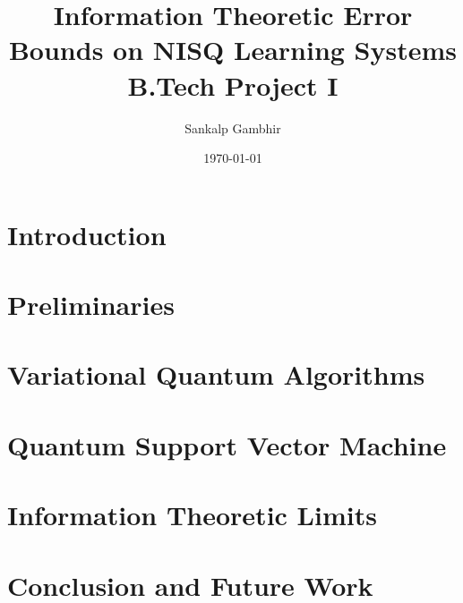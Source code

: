 \documentclass[
    paper=a4, 
    lang=en, 
    font=kpfonts, 
    hanging-titles=true,
    final
]
{skrapport}
\title{
    {Information Theoretic Error Bounds on NISQ Learning Systems} \\
    {\large B.Tech Project I}
    }
\author[sgambhir@iitb.ac.in]{Sankalp Gambhir}
\date{\today}
\begin{document}
    \begin{titlepage}
        \maketitle
        \begin{abstract}
            \lipsum[1]
        \end{abstract}        
    \end{titlepage}

    \tableofcontents \pagebreak

    \section{Introduction}
        \label{sec:intro}
        
    
    \section{Preliminaries}
        \label{sec:prelim}
        

    \section{Variational Quantum Algorithms}
        \label{sec:vqa}
        

    \section{Quantum Support Vector Machine}
        \label{sec:qsvm}
        
    
    \section{Information Theoretic Limits}
        \label{sec:infolimits}
        

    \section{Conclusion and Future Work}
        \label{sec:future}
        

    \printbibliography
\end{document}
